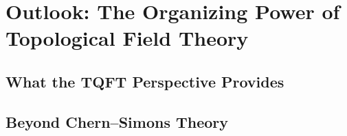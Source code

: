 %
%
%

\section{Outlook: The Organizing Power of Topological Field Theory}


\subsection{What the TQFT Perspective Provides}


\subsection{Beyond Chern--Simons Theory}

%

